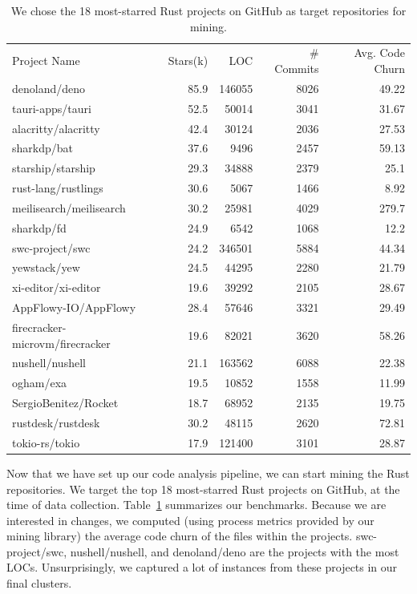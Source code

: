 \begin{table}
\caption{\label{table:repos} We chose the 18 most-starred Rust projects on GitHub as target repositories for mining.
}
\begin{tabular}{l r r r r}
    Project Name & Stars(k) & LOC & \# Commits & Avg. Code Churn \\
    denoland/deno & 85.9 & 146055 & 8026 & 49.22 \\
    tauri-apps/tauri & 52.5 & 50014 & 3041 & 31.67 \\
    alacritty/alacritty & 42.4 & 30124 & 2036 & 27.53 \\
    sharkdp/bat & 37.6 & 9496 & 2457 & 59.13 \\
    starship/starship & 29.3 & 34888 & 2379 & 25.1 \\
    rust-lang/rustlings & 30.6 & 5067 & 1466 & 8.92 \\
    meilisearch/meilisearch & 30.2 & 25981 & 4029 & 279.7 \\
    sharkdp/fd & 24.9 & 6542 & 1068 & 12.2 \\
    swc-project/swc & 24.2 & 346501 & 5884 & 44.34 \\
    yewstack/yew & 24.5 & 44295 & 2280 & 21.79 \\
    xi-editor/xi-editor & 19.6 & 39292 & 2105 & 28.67 \\
    AppFlowy-IO/AppFlowy & 28.4 & 57646 & 3321 & 29.49 \\
    firecracker-microvm/firecracker & 19.6 & 82021 & 3620 & 58.26 \\
    nushell/nushell & 21.1 & 163562 & 6088 & 22.38 \\
    ogham/exa & 19.5 & 10852 & 1558 & 11.99 \\
    SergioBenitez/Rocket & 18.7 & 68952 & 2135 & 19.75 \\
    rustdesk/rustdesk & 30.2 & 48115 & 2620 & 72.81 \\
    tokio-rs/tokio & 17.9 & 121400 & 3101 & 28.87 
\end{tabular}
\end{table}
   

Now that we have set up our code analysis pipeline, we can start mining the Rust repositories. We target the top 18 most-starred Rust projects on GitHub, at the time of data collection. Table~\ref{table:repos} summarizes our benchmarks. Because we are interested in changes, we computed (using process metrics provided by our mining library) the average code churn of the files within the projects. swc-project/swc, nushell/nushell, and denoland/deno are the projects with the most LOCs. Unsurprisingly, we captured a lot of instances from these projects in our final clusters.

